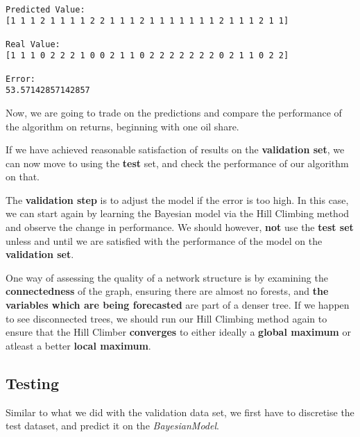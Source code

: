 \documentclass[11pt]{report}
\begin{document}
    \begin{Verbatim}[commandchars=\\\{\}]

Predicted Value: 
[1 1 1 2 1 1 1 1 2 2 1 1 1 2 1 1 1 1 1 1 1 2 1 1 1 2 1 1]

Real Value: 
[1 1 1 0 2 2 2 1 0 0 2 1 1 0 2 2 2 2 2 2 2 0 2 1 1 0 2 2]

Error: 
53.57142857142857

    \end{Verbatim}

    Now, we are going to trade on the predictions and compare the
performance of the algorithm on returns, beginning with one oil share.

    If we have achieved reasonable satisfaction of results on the
\textbf{validation set}, we can now move to using the \textbf{test} set,
and check the performance of our algorithm on that.

The \textbf{validation step} is to adjust the model if the error is too
high. In this case, we can start again by learning the Bayesian model
via the Hill Climbing method and observe the change in performance. We
should however, \textbf{not} use the \textbf{test set} unless and until
we are satisfied with the performance of the model on the
\textbf{validation set}.

One way of assessing the quality of a network structure is by examining
the \textbf{connectedness} of the graph, ensuring there are almost no
forests, and \textbf{the variables which are being forecasted} are part
of a denser tree. If we happen to see disconnected trees, we should run
our Hill Climbing method again to ensure that the Hill Climber
\textbf{converges} to either ideally a \textbf{global maximum} or
atleast a better \textbf{local maximum}.

\hypertarget{testing}{%
\subsection{Testing}\label{testing}}

Similar to what we did with the validation data set, we first have to
discretise the test dataset, and predict it on the \emph{BayesianModel}.
\end{document}
